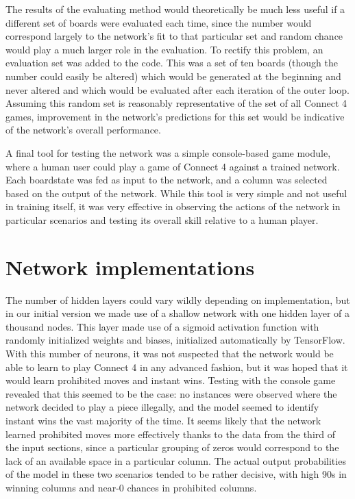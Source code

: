 \documentclass[12pt]{article}
\begin{document}
The results of the evaluating method would theoretically be much less useful if a different set of boards were evaluated each time, since the number would correspond largely to the network’s fit to that particular set and random chance would play a much larger role in the evaluation. To rectify this problem, an evaluation set was added to the code. This was a set of ten boards (though the number could easily be altered) which would be generated at the beginning and never altered and which would be evaluated after each iteration of the outer loop. Assuming this random set is reasonably representative of the set of all Connect 4 games, improvement in the network’s predictions for this set would be indicative of the network’s overall performance.

A final tool for testing the network was a simple console-based game module, where a human user could play a game of Connect 4 against a trained network. Each boardstate was fed as input to the network, and a column was selected based on the output of the network. While this tool is very simple and not useful in training itself, it was very effective in observing the actions of the network in particular scenarios and testing its overall skill relative to a human player.

\section{Network implementations}
The number of hidden layers could vary wildly depending on implementation, but in our initial version we made use of a shallow network with one hidden layer of a thousand nodes. This layer made use of a sigmoid activation function with randomly initialized weights and biases, initialized automatically by TensorFlow. With this number of neurons, it was not suspected that the network would be able to learn to play Connect 4 in any advanced fashion, but it was hoped that it would learn prohibited moves and instant wins. Testing with the console game revealed that this seemed to be the case: no instances were observed where the network decided to play a piece illegally, and the model seemed to identify instant wins the vast majority of the time. It seems likely that the network learned prohibited moves more effectively thanks to the data from the third of the input sections, since a particular grouping of zeros would correspond to the lack of an available space in a particular column. The actual output probabilities of the model in these two scenarios tended to be rather decisive, with high 90s in winning columns and near-0 chances in prohibited columns.
\end{document}

